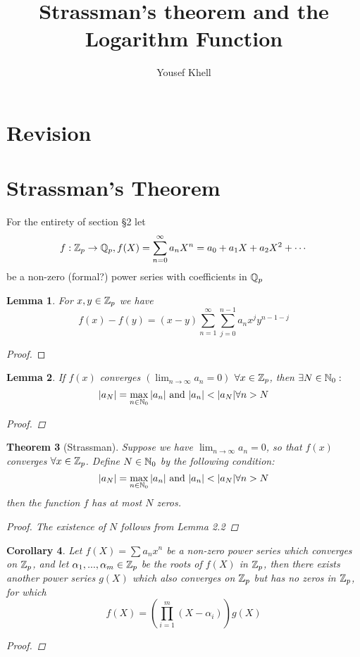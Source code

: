 \documentclass[a4paper]{article}
\title{\vspace{-2cm}Strassman's theorem and the Logarithm Function}
\author{Yousef Khell}
\theoremstyle{plain}
\newtheorem{thm}{Theorem}[section]
\newtheorem{lemm}[thm]{Lemma}
\newtheorem{Cor}[thm]{Corollary}
\theoremstyle{definition}
\begin{document}
\section{Revision}
\section{Strassman's Theorem}
For the entirety of section §2 let
$$f: \Bbb Z_{p} \to \Bbb Q_{p}, f(X) = \sum_{n=0}^{\infty}a_{n}X^{n} = a_{0} + a_{1}X + a_{2}X^{2} + \cdots$$
be a non-zero (formal?) power series with coefficients in $\Bbb Q_{p}$
\begin{lemm}
  For $x, y \in \Bbb Z_{p}$ we have
  $$f(x) - f(y) = (x-y)\sum_{n=1}^{\infty}\sum_{j=0}^{n-1}a_{n}x^{j}y^{n-1-j}$$
\end{lemm}
\begin{proof}

\end{proof}
\begin{lemm}
If $f(x)$ converges $(\lim_{n\to \infty} a_{n} = 0)$ $\forall x \in \Bbb Z_{p}$, then $\exists N \in \Bbb N_{0}:$
$$|a_{N}| = \max_{n \in \Bbb N_{0}}|a_{n}| \text{ and } |a_{n}| < |a_{N}| \forall n > N$$
\begin{proof}

\end{proof}
\end{lemm}
\begin{thm}[Strassman] %
Suppose we have $\lim_{n \to \infty}a_{n} = 0$, so that $f(x)$ converges $\forall x \in \Bbb Z_{p}$. Define $N \in \Bbb N_{0}$ by the following condition:
$$|a_{N}| = \max_{n \in \Bbb N_{0}}|a_{n}| \text{ and } |a_{n}| < |a_{N}| \forall n > N$$
then the function $f$ has at most $N$ zeros.
\begin{proof}
  The existence of $N$ follows from Lemma 2.2
\end{proof}
\end{thm}
\begin{Cor}
  Let $f(X) = \sum a_{n}x^{n}$ be a non-zero power series which converges on $\Bbb Z_{p}$, and let $\alpha_{1}, ..., \alpha_{m} \in \Bbb Z_{p}$ be the roots of $f(X)$ in $\Bbb Z_{p}$, then there exists another power series $g(X)$ which also converges on $\Bbb Z_{p}$ but has no zeros in $\Bbb Z_{p}$, for which
  $$f(X) = \left(\prod_{i=1}^{m}(X-\alpha_{i})\right)g(X)$$
  \begin{proof}

  \end{proof}
\end{Cor}
\end{document}
